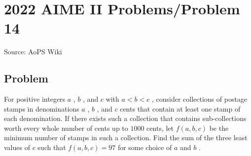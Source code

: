 \documentclass[12pt]{article}
\begin{document}
\section*{{2022 AIME II Problems/Problem 14}}
Source: AoPS Wiki

\subsection*{Problem}
For positive integers $a$ , $b$ , and $c$ with $a < b < c$ , consider collections of postage stamps in denominations $a$ , $b$ , and $c$ cents that contain at least one stamp of each denomination. If there exists such a collection that contains sub-collections worth every whole number of cents up to $1000$ cents, let $f(a, b, c)$ be the minimum number of stamps in such a collection. Find the sum of the three least values of $c$ such that $f(a, b, c) = 97$ for some choice of $a$ and $b$ .
\end{document}
